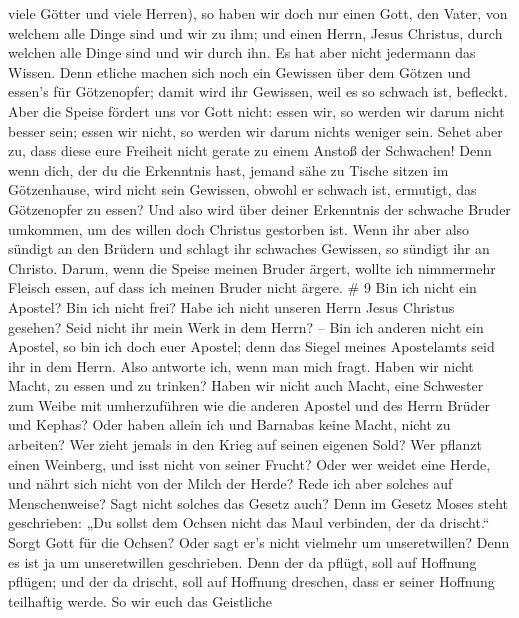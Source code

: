 viele Götter und viele Herren),  so haben wir doch nur einen
Gott, den Vater, von welchem alle Dinge sind und wir zu ihm; und einen
Herrn, Jesus Christus, durch welchen alle Dinge sind und wir durch ihn.
 Es hat aber nicht jedermann das Wissen. Denn etliche machen
sich noch ein Gewissen über dem Götzen und essen's für Götzenopfer;
damit wird ihr Gewissen, weil es so schwach ist, befleckt. 
Aber die Speise fördert uns vor Gott nicht: essen wir, so werden wir
darum nicht besser sein; essen wir nicht, so werden wir darum nichts
weniger sein.  Sehet aber zu, dass diese eure Freiheit nicht
gerate zu einem Anstoß der Schwachen!  Denn wenn dich, der
du die Erkenntnis hast, jemand sähe zu Tische sitzen im Götzenhause,
wird nicht sein Gewissen, obwohl er schwach ist, ermutigt, das
Götzenopfer zu essen?  Und also wird über deiner Erkenntnis
der schwache Bruder umkommen, um des willen doch Christus gestorben ist.
 Wenn ihr aber also sündigt an den Brüdern und schlagt ihr
schwaches Gewissen, so sündigt ihr an Christo.  Darum, wenn
die Speise meinen Bruder ärgert, wollte ich nimmermehr Fleisch essen,
auf dass ich meinen Bruder nicht ärgere. \# 9  Bin ich nicht
ein Apostel? Bin ich nicht frei? Habe ich nicht unseren Herrn Jesus
Christus gesehen? Seid nicht ihr mein Werk in dem Herrn? -- 
Bin ich anderen nicht ein Apostel, so bin ich doch euer Apostel; denn
das Siegel meines Apostelamts seid ihr in dem Herrn.  Also
antworte ich, wenn man mich fragt.  Haben wir nicht Macht,
zu essen und zu trinken?  Haben wir nicht auch Macht, eine
Schwester zum Weibe mit umherzuführen wie die anderen Apostel und des
Herrn Brüder und Kephas?  Oder haben allein ich und Barnabas
keine Macht, nicht zu arbeiten?  Wer zieht jemals in den
Krieg auf seinen eigenen Sold? Wer pflanzt einen Weinberg, und isst
nicht von seiner Frucht? Oder wer weidet eine Herde, und nährt sich
nicht von der Milch der Herde?  Rede ich aber solches auf
Menschenweise? Sagt nicht solches das Gesetz auch?  Denn im
Gesetz Moses steht geschrieben: „Du sollst dem Ochsen nicht das Maul
verbinden, der da drischt.`` Sorgt Gott für die Ochsen? 
Oder sagt er's nicht vielmehr um unseretwillen? Denn es ist ja um
unseretwillen geschrieben. Denn der da pflügt, soll auf Hoffnung
pflügen; und der da drischt, soll auf Hoffnung dreschen, dass er seiner
Hoffnung teilhaftig werde.  So wir euch das Geistliche
